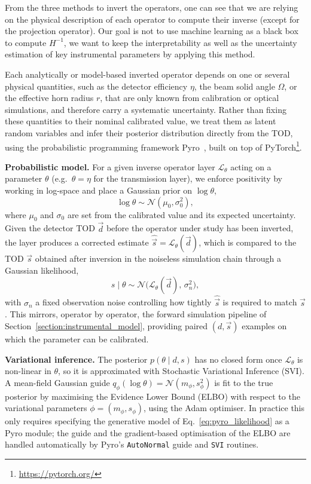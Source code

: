 \documentclass[../../thesis.tex]{subfiles}
\begin{document}
From the three methods to invert the operators, one can see that we are relying on the physical description of each operator to compute their inverse (except for the projection operator). Our goal is not to use machine learning as a black box to compute $H^{-1}$, we want to keep the interpretability as well as the uncertainty estimation of key instrumental parameters by applying this method.

Each analytically or model-based inverted operator depends on one or several physical quantities, such as the detector efficiency $\eta$, the beam solid angle $\Omega$, or the effective horn radius $r$, that are only known from calibration or optical simulations, and therefore carry a systematic uncertainty. Rather than fixing these quantities to their nominal calibrated value, we treat them as latent random variables and infer their posterior distribution directly from the TOD, using the probabilistic programming framework Pyro~\cite{bingham2019pyro}, built on top of PyTorch\footnote{\url{https://pytorch.org/}}.

\textbf{Probabilistic model.}
For a given inverse operator layer $\mathcal{L}_\theta$ acting on a parameter $\theta$ (e.g.\ $\theta = \eta$ for the transmission layer), we enforce positivity by working in log-space and place a Gaussian prior on $\log\theta$,
\begin{equation}
    \log\theta \sim \mathcal{N}(\mu_0, \sigma_0^2),
\end{equation}
where $\mu_0$ and $\sigma_0$ are set from the calibrated value and its expected uncertainty. Given the detector TOD $\vec{d}$ before the operator under study has been inverted, the layer produces a corrected estimate $\hat{\vec{s}} = \mathcal{L}_\theta(\vec{d})$, which is compared to the TOD $\vec{s}$ obtained after inversion in the noiseless simulation chain through a Gaussian likelihood,
\begin{equation}
    s \mid \theta \sim \mathcal{N}\big(\mathcal{L}_\theta(\vec{d}),\, \sigma_n^2\big),
    \label{eq:pyro_likelihood}
\end{equation}
with $\sigma_n$ a fixed observation noise controlling how tightly $\hat{\vec{s}}$ is required to match $\vec{s}$. This mirrors, operator by operator, the forward simulation pipeline of Section~\ref{section:instrumental_model}, providing paired $(d, \vec{s})$ examples on which the parameter can be calibrated.

\textbf{Variational inference.}
The posterior $p(\theta \mid d, s)$ has no closed form once $\mathcal{L}_\theta$ is non-linear in $\theta$, so it is approximated with Stochastic Variational Inference (SVI). A mean-field Gaussian guide $q_\phi(\log\theta) = \mathcal{N}(m_\phi, s_\phi^2)$ is fit to the true posterior by maximising the Evidence Lower Bound (ELBO) with respect to the variational parameters $\phi = (m_\phi, s_\phi)$, using the Adam optimiser. In practice this only requires specifying the generative model of Eq.~\ref{eq:pyro_likelihood} as a Pyro module; the guide and the gradient-based optimisation of the ELBO are handled automatically by Pyro's \texttt{AutoNormal} guide and \texttt{SVI} routines.
\end{document}
